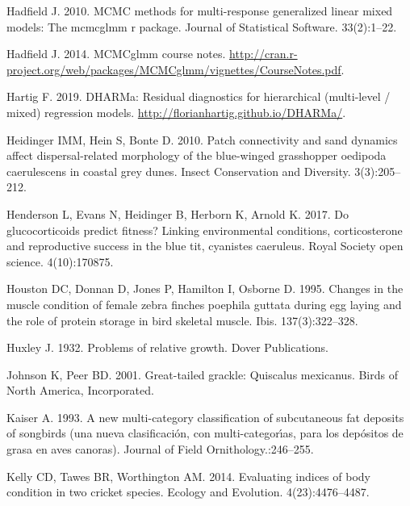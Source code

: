 \documentclass[
]{article}
\begin{document}
\leavevmode\hypertarget{ref-hadfield2010mcmc}{}%
Hadfield J. 2010. MCMC methods for multi-response generalized linear
mixed models: The mcmcglmm r package. Journal of Statistical Software.
33(2):1--22.

\leavevmode\hypertarget{ref-hadfield2014coursenotes}{}%
Hadfield J. 2014. MCMCglmm course notes.
\url{http://cran.r-project.org/web/packages/MCMCglmm/vignettes/CourseNotes.pdf}.

\leavevmode\hypertarget{ref-Hartig2019dharma}{}%
Hartig F. 2019. DHARMa: Residual diagnostics for hierarchical
(multi-level / mixed) regression models.
\url{http://florianhartig.github.io/DHARMa/}.

\leavevmode\hypertarget{ref-heidinger2010patch}{}%
Heidinger IMM, Hein S, Bonte D. 2010. Patch connectivity and sand
dynamics affect dispersal-related morphology of the blue-winged
grasshopper oedipoda caerulescens in coastal grey dunes. Insect
Conservation and Diversity. 3(3):205--212.

\leavevmode\hypertarget{ref-henderson2017glucocorticoids}{}%
Henderson L, Evans N, Heidinger B, Herborn K, Arnold K. 2017. Do
glucocorticoids predict fitness? Linking environmental conditions,
corticosterone and reproductive success in the blue tit, cyanistes
caeruleus. Royal Society open science. 4(10):170875.

\leavevmode\hypertarget{ref-houston1995changes}{}%
Houston DC, Donnan D, Jones P, Hamilton I, Osborne D. 1995. Changes in
the muscle condition of female zebra finches poephila guttata during egg
laying and the role of protein storage in bird skeletal muscle. Ibis.
137(3):322--328.

\leavevmode\hypertarget{ref-huxley1932problems}{}%
Huxley J. 1932. Problems of relative growth. Dover Publications.

\leavevmode\hypertarget{ref-johnson2001great}{}%
Johnson K, Peer BD. 2001. Great-tailed grackle: Quiscalus mexicanus.
Birds of North America, Incorporated.

\leavevmode\hypertarget{ref-kaiser1993new}{}%
Kaiser A. 1993. A new multi-category classification of subcutaneous fat
deposits of songbirds (una nueva clasificación, con multi-categorı́as,
para los depósitos de grasa en aves canoras). Journal of Field
Ornithology.:246--255.

\leavevmode\hypertarget{ref-kelly2014evaluating}{}%
Kelly CD, Tawes BR, Worthington AM. 2014. Evaluating indices of body
condition in two cricket species. Ecology and Evolution.
4(23):4476--4487.
\end{document}
